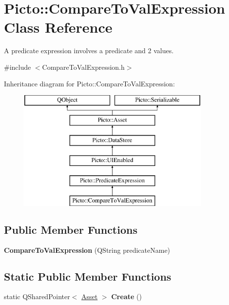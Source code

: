 \hypertarget{class_picto_1_1_compare_to_val_expression}{\section{Picto\-:\-:Compare\-To\-Val\-Expression Class Reference}
\label{class_picto_1_1_compare_to_val_expression}
}


A predicate expression involves a predicate and 2 values.  




{\ttfamily \#include $<$Compare\-To\-Val\-Expression.\-h$>$}

Inheritance diagram for Picto\-:\-:Compare\-To\-Val\-Expression\-:\begin{figure}[H]
\begin{center}
\leavevmode
\includegraphics[height=6.000000cm]{class_picto_1_1_compare_to_val_expression}
\end{center}
\end{figure}
\subsection*{Public Member Functions}
\begin{DoxyCompactItemize}
\item 
\hypertarget{class_picto_1_1_compare_to_val_expression_a693f9bbcd231e30e96def7aeea7c6d8b}{{\bfseries Compare\-To\-Val\-Expression} (Q\-String predicate\-Name)}\label{class_picto_1_1_compare_to_val_expression_a693f9bbcd231e30e96def7aeea7c6d8b}

\end{DoxyCompactItemize}
\subsection*{Static Public Member Functions}
\begin{DoxyCompactItemize}
\item 
\hypertarget{class_picto_1_1_compare_to_val_expression_ad4e1131801a171c1fd8b366b5c11078f}{static Q\-Shared\-Pointer$<$ \hyperlink{class_picto_1_1_asset}{Asset} $>$ {\bfseries Create} ()}\label{class_picto_1_1_compare_to_val_expression_ad4e1131801a171c1fd8b366b5c11078f}

\end{DoxyCompactItemize}
